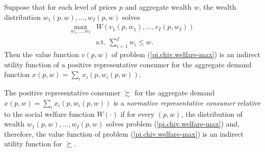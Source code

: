 \begin{prop}
    Suppose that for each level of prices $p$ and aggregate wealth $w$, the wealth distribution $w_1(p, w), \dots, w_I(p, w)$ solves 
    \begin{equation}\label{pi.chiv.welfare-max}
        \begin{aligned}
            \max_{w_1, \dots, w_I} &W\left(v_1(p, w_1), \dots, v_I(p, w_I) \right) \\
            & \text{s.t. } \sum_{i = 1}^I w_i \leq w.
        \end{aligned}
    \end{equation}
    Then the value function $v(p, w)$ of problem (\ref{pi.chiv.welfare-max}) is an indirect utility function of a positive representative consumer for the aggregate demand function $x(p, w) = \sum_i x_i(p, w_i(p, w))$.
\end{prop}

\begin{defn}
    The positive representative consumer $\succsim$ for the aggregate demand $x(p, w) = \sum_i x_i(p, w_i(p, w))$ is a \emph{normative representative consumer} relative to the social welfare function $W(\cdot)$ if for every $(p, w)$, the distribution of wealth $w_1(p, w), \dots, w_I(p, w)$ solves problem (\ref{pi.chiv.welfare-max}) and, therefore, the value function of problem (\ref{pi.chiv.welfare-max}) is an indirect utility function for $\succsim$.
\end{defn}
